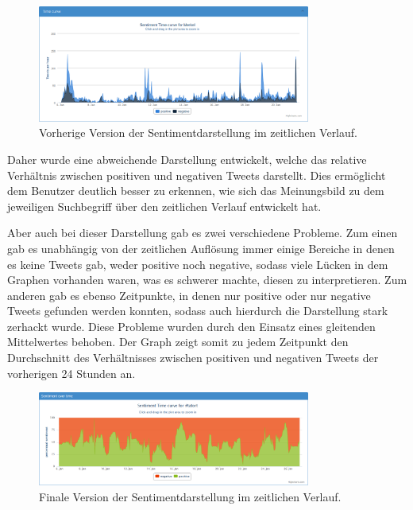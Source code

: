 \begin{figure}[h]
 \centering
 \includegraphics[width=0.8\textwidth]{Bilder/Frontend/Screenshots/sentimentPerHour-oldVersion.png}
\caption{Vorherige Version der Sentimentdarstellung im zeitlichen Verlauf.}
\label{img:SentOverTimeOld}
\end{figure} 

Daher wurde eine abweichende Darstellung entwickelt, welche das relative Verhältnis zwischen positiven und negativen Tweets darstellt. Dies ermöglicht dem Benutzer deutlich besser zu erkennen, wie sich das Meinungsbild zu dem jeweiligen Suchbegriff über den zeitlichen Verlauf entwickelt hat.

Aber auch bei dieser Darstellung gab es zwei verschiedene Probleme. Zum einen gab es unabhängig von der zeitlichen Auflösung immer einige Bereiche in denen es keine Tweets gab, weder positive noch negative, sodass viele Lücken in dem Graphen vorhanden waren, was es schwerer machte, diesen zu interpretieren. Zum anderen gab es ebenso Zeitpunkte, in denen nur positive oder nur negative Tweets gefunden werden konnten, sodass auch hierdurch die Darstellung stark zerhackt wurde. Diese Probleme wurden durch den Einsatz eines gleitenden Mittelwertes behoben. Der Graph zeigt somit zu jedem Zeitpunkt den Durchschnitt des Verhältnisses zwischen positiven und negativen Tweets der vorherigen 24 Stunden an.

\begin{figure}
 \centering
 \includegraphics[width=0.8\textwidth]{Bilder/Frontend/Screenshots/latestSentimentPerHourTatort.png}
\caption{Finale Version der Sentimentdarstellung im zeitlichen Verlauf.}
\label{img:SentOverTimeFinal}
\end{figure} 

